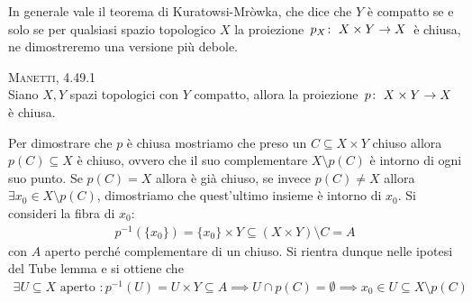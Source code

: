 In generale vale il teorema di Kuratowsi-Mròwka, che dice che $Y$ è compatto se e solo se per qualsiasi spazio topologico $X$ la proiezione $\funz {p_X} {X\times Y} X$ è chiusa, ne dimostreremo una versione più debole.
\begin{theorema} \textsc{Manetti, 4.49.1} \\
	Siano $X,Y$ spazi topologici con $Y$ compatto, allora la proiezione $\funz p {X\times Y} X$ è chiusa.
\end{theorema}
\begin{demonstration}
	Per dimostrare che $p$ è chiusa mostriamo che preso un $C\subseteq X\times Y$ chiuso allora $p(C)\subseteq X$ è chiuso, ovvero che il suo complementare $X\setminus p(C)$ è intorno di ogni suo punto.\newline
	Se $p(C)=X$ allora è già chiuso, se invece $p(C)\neq X$ allora $\exists x_0\in X\setminus p(C)$, dimostriamo che quest'ultimo insieme è intorno di $x_0$. Si consideri la fibra di $x_0$:
		\begin{gather*}
			p^{-1}(\{x_0\} )=\{x_0\}\times Y \subseteq (X\times Y)\setminus C=A 
		\end{gather*}
	con $A$ aperto perché complementare di un chiuso. \newline
	Si rientra dunque nelle ipotesi del Tube lemma e si ottiene che
		\begin{gather*}
			\exists U\subseteq X \text{ aperto } \colon p^{-1}(U)=U\times Y\subseteq A \implies U\cap p(C)=\emptyset \implies x_0\in U\subseteq X\setminus p(C)
		\end{gather*}
\end{demonstration}